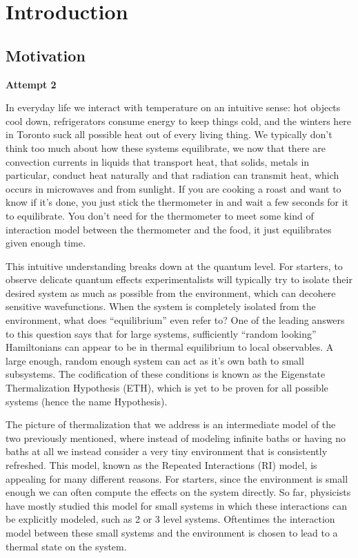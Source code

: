 \chapter{Introduction}


\section{Motivation}
\textbf{Attempt 2}

In everyday life we interact with temperature on an intuitive sense: hot objects cool down, refrigerators consume energy to keep things cold, and the winters here in Toronto suck all possible heat out of every living thing. We typically don't think too much about how these systems equilibrate, we now that there are convection currents in liquids that transport heat, that solids, metals in particular, conduct heat naturally and that radiation can transmit heat, which occurs in microwaves and from sunlight. If you are cooking a roast and want to know if it's done, you just stick the thermometer in and wait a few seconds for it to equilibrate. You don't need for the thermometer to meet some kind of interaction model between the thermometer and the food, it just equilibrates given enough time. 

This intuitive understanding breaks down at the quantum level. For starters, to observe delicate quantum effects experimentalists will typically try to isolate their desired system as much as possible from the environment, which can decohere sensitive wavefunctions. When the system is completely isolated from the environment, what does ``equilibrium'' even refer to? One of the leading answers to this question says that for large systems, sufficiently ``random looking'' Hamiltonians can appear to be in thermal equilibrium to local observables. A large enough, random enough system can act as it's own bath to small subsystems. The codification of these conditions is known as the Eigenstate Thermalization Hypothesis (ETH), which is yet to be proven for all possible systems (hence the name Hypothesis).

The picture of thermalization that we address is an intermediate model of the two previously mentioned, where instead of modeling infinite baths or having no baths at all we instead consider a very tiny environment that is consistently refreshed. This model, known as the Repeated Interactions (RI) model, is appealing for many different reasons. For starters, since the environment is small enough we can often compute the effects on the system directly. So far, physicists have mostly studied this model for small systems in which these interactions can be explicitly modeled, such as 2 or 3 level systems. Oftentimes the interaction model between these small systems and the environment is chosen to lead to a thermal state on the system.

